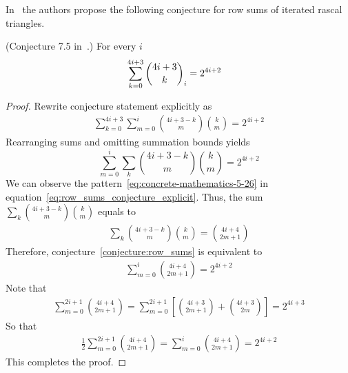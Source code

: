 In~\cite{gregory2023iterated_Aequationes} the authors
propose the following conjecture for row sums of iterated rascal triangles.
\begin{conj}
    \label{conjecture:row_sums}
    (Conjecture 7.5 in~\cite{gregory2023iterated_Aequationes}.)
    For every $i$
    \begin{align*}
        \sum_{k=0}^{4i+3} \binom{4i+3}{k}_{i} &= 2^{4i+2}
    \end{align*}
\end{conj}
\begin{proof}
    Rewrite conjecture statement explicitly as
    \begin{align*}
        \sum_{k=0}^{4i+3} \sum_{m=0}^{i} \binom{4i+3-k}{m} \binom{k}{m} = 2^{4i+2}
    \end{align*}
    Rearranging sums and omitting summation bounds yields
    \begin{equation}
        \sum_{m=0}^{i}  \sum_{k} \binom{4i+3-k}{m} \binom{k}{m} = 2^{4i+2}\label{eq:row_sums_conjecture_explicit}
    \end{equation}
    We can observe the pattern~\eqref{eq:concrete-mathematics-5-26}
    in equation~\eqref{eq:row_sums_conjecture_explicit}.
    Thus, the sum $\sum_{k} \binom{4i+3-k}{m} \binom{k}{m}$ equals to
    \begin{align*}
        \sum_{k} \binom{4i+3-k}{m} \binom{k}{m} = \binom{4i+4}{2m+1}
    \end{align*}
    Therefore, conjecture~\eqref{conjecture:row_sums} is equivalent to
    \begin{align*}
        \sum_{m=0}^{i} \binom{4i+4}{2m+1} = 2^{4i+2}
    \end{align*}
    Note that
    \begin{align*}
        \sum_{m=0}^{2i+1} \binom{4i+4}{2m+1}= \sum_{m=0}^{2i+1} \left[ \binom{4i+3}{2m+1} + \binom{4i+3}{2m} \right] = 2^{4i+3}
    \end{align*}
    So that
    \begin{align*}
        \frac{1}{2} \sum_{m=0}^{2i+1} \binom{4i+4}{2m+1} = \sum_{m=0}^{i} \binom{4i+4}{2m+1} = 2^{4i+2}
    \end{align*}
    This completes the proof.
\end{proof}
